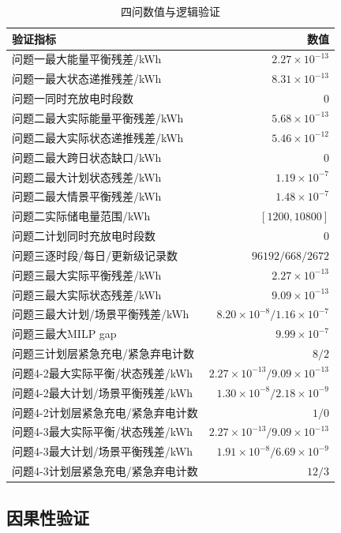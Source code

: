 \documentclass[UTF8,12pt,a4paper]{ctexart}
\begin{document}
\begin{table}[H]
\centering
\caption{四问数值与逻辑验证}
\label{tab:validation}
\begin{tabular}{p{8.2cm}r}
\toprule
验证指标 & 数值\\
\midrule
问题一最大能量平衡残差/kWh & $2.27\times10^{-13}$\\
问题一最大状态递推残差/kWh & $8.31\times10^{-13}$\\
问题一同时充放电时段数 & 0\\
问题二最大实际能量平衡残差/kWh & $5.68\times10^{-13}$\\
问题二最大实际状态递推残差/kWh & $5.46\times10^{-12}$\\
问题二最大跨日状态缺口/kWh & 0\\
问题二最大计划状态残差/kWh & $1.19\times10^{-7}$\\
问题二最大情景平衡残差/kWh & $1.48\times10^{-7}$\\
问题二实际储电量范围/kWh & $[1200,10800]$\\
问题二计划同时充放电时段数 & 0\\
问题三逐时段/每日/更新级记录数 & $96192/668/2672$\\
问题三最大实际平衡残差/kWh & $2.27\times10^{-13}$\\
问题三最大实际状态残差/kWh & $9.09\times10^{-13}$\\
问题三最大计划/场景平衡残差/kWh & $8.20\times10^{-8}/1.16\times10^{-7}$\\
问题三最大MILP gap & $9.99\times10^{-7}$\\
问题三计划层紧急充电/紧急弃电计数 & $8/2$\\
问题4-2最大实际平衡/状态残差/kWh & $2.27\times10^{-13}/9.09\times10^{-13}$\\
问题4-2最大计划/场景平衡残差/kWh & $1.30\times10^{-8}/2.18\times10^{-9}$\\
问题4-2计划层紧急充电/紧急弃电计数 & $1/0$\\
问题4-3最大实际平衡/状态残差/kWh & $2.27\times10^{-13}/9.09\times10^{-13}$\\
问题4-3最大计划/场景平衡残差/kWh & $1.91\times10^{-8}/6.69\times10^{-9}$\\
问题4-3计划层紧急充电/紧急弃电计数 & $12/3$\\
\bottomrule
\end{tabular}
\end{table}

\subsection{因果性验证}
\end{document}
